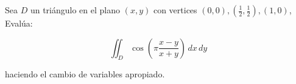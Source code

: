 Sea $D$ un triángulo en el plano \((x, y)\) con vertices \((0, 0), \left(\frac{1}{2}, \frac{1}{2}\right), (1, 0)\), Evalúa:

\[
\iint_D \cos\left(\pi \frac{x-y}{x+y}\right) \, dx \, dy
\]

haciendo el cambio de variables apropiado.
